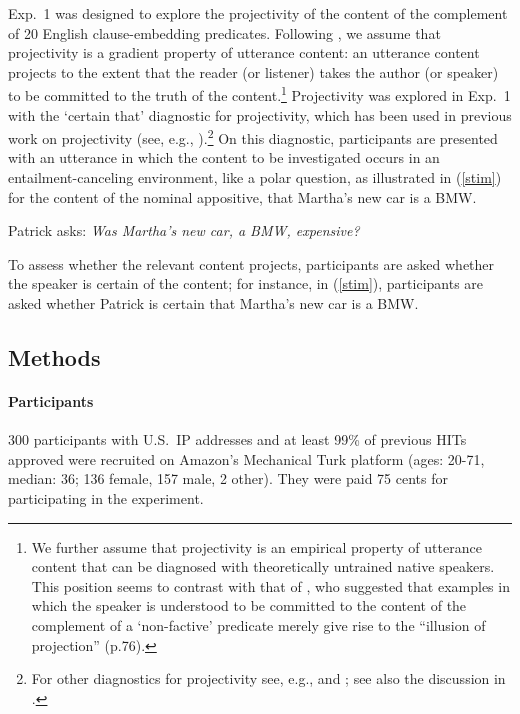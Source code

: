 \documentclass[11pt,fleqn]{article}
\newcommand{\6}{\mbox{$[\hspace*{-.6mm}[$}}
\newcommand{\9}{\mbox{$]\hspace*{-.6mm}]$}}
\begin{document}
Exp.~1 was designed to explore the projectivity of the content of the complement of 20 English clause-embedding predicates. Following \citealt{tbd-variability}, we assume that projectivity is a gradient property of utterance content: an utterance content projects to the extent that the reader (or listener) takes the author (or speaker) to be committed to the truth of the content.\footnote{We further assume that projectivity is an empirical property of utterance content that can be diagnosed with theoretically untrained native speakers. This position seems to contrast with that of \citet{anand-hacquard2014}, who suggested that examples in which the speaker is understood to be committed to the content of the complement of a `non-factive' predicate merely give rise to the ``illusion of projection'' (p.76).} Projectivity was explored in Exp.~1 with the `certain that' diagnostic for projectivity, which has been used in previous work on projectivity (see, e.g., \citealt{tonhauser-salt26,djaerv-bacovcin-salt27,stevens-etal2017,tbd-variability}).\footnote{For other diagnostics for projectivity see, e.g., \citealt{smith-hall11,xue-onea11} and \citealt{brst-lang11}; see also the discussion in \citealt{tbd-variability}.} On this diagnostic, participants are presented with an utterance in which the content to be investigated occurs in an entailment-canceling environment, like a polar question, as illustrated in (\ref{stim}) for the content of the nominal appositive, that Martha's new car is a BMW.

\begin{exe}

\ex\label{stim} Patrick asks: {\em Was Martha's new car, a BMW, expensive?} 

\end{exe}
To assess whether the relevant content projects, participants are asked whether the speaker is certain of the content; for instance, in (\ref{stim}), participants are asked whether Patrick is certain that Martha's new car is a BMW. 
 

\subsection{Methods}

\paragraph{Participants} 300 participants with U.S.\ IP addresses and at least 99\% of previous HITs approved were recruited on Amazon's Mechanical Turk platform (ages: 20-71, median: 36; 136 female, 157 male, 2 other). They were paid 75 cents for participating in the experiment.
\end{document}

